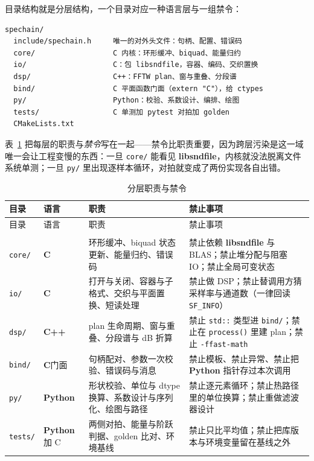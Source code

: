 \documentclass[12pt,a4paper,fontset=fandol]{ctexbook}
\newcommand{\Fn}[1]{\texttt{#1()}}
\newcommand{\Tp}[1]{\texttt{#1}}
\newcommand{\Lib}[1]{\textbf{#1}}
\newcommand{\Lang}[1]{\textsf{\bfseries #1}}
\newcommand{\CL}{\Lang{C}}
\newcommand{\CPP}{\Lang{C++}}
\newcommand{\PY}{\Lang{Python}}
\begin{document}
目录结构就是分层结构，一个目录对应一种语言层与一组禁令：

\begin{lstlisting}[style=shellstyle,caption={工程目录：目录边界即语言与依赖边界},label={lst:ch17-tree}]
spechain/
  include/spechain.h     唯一的对外头文件：句柄、配置、错误码
  core/                  C 内核：环形缓冲、biquad、能量归约
  io/                    C：包 libsndfile，容器、编码、交织置换
  dsp/                   C++：FFTW plan、窗与重叠、分段谱
  bind/                  C 平面函数门面（extern "C"），给 ctypes
  py/                    Python：校验、系数设计、编排、绘图
  tests/                 C 单测加 pytest 对拍加 golden
  CMakeLists.txt
\end{lstlisting}

表~\ref{tab:ch17-layers} 把每层的职责与\emph{禁令}写在一起——禁令比职责重要，因为跨层污染是这一域唯一会让工程变慢的东西：一旦 \Tp{core/} 能看见 \Lib{libsndfile}，内核就没法脱离文件系统单测；一旦 \Tp{py/} 里出现逐样本循环，对拍就变成了两份实现各自出错。

\begin{longtable}{@{}>{\raggedright\arraybackslash}p{}
  >{\raggedright\arraybackslash}p{}
  >{\raggedright\arraybackslash}p{}
  >{\raggedright\arraybackslash}p{}@{}}
\caption{分层职责与禁令}\label{tab:ch17-layers} \\
\toprule
目录 & 语言 & 职责 & 禁止事项 \\
\midrule
\endfirsthead
\toprule
目录 & 语言 & 职责 & 禁止事项 \\
\midrule
\endhead
\midrule
\multicolumn{4}{@{}r}{（接下页）}\\
\endfoot
\bottomrule
\endlastfoot
\Tp{core/} & \CL &
  环形缓冲、biquad 状态更新、能量归约、错误码 &
  禁止依赖 \Lib{libsndfile} 与 BLAS；禁止堆分配与阻塞 IO；禁止全局可变状态 \\
\Tp{io/} & \CL &
  打开与关闭、容器与子格式、交织与平面置换、短读处理 &
  禁止做 DSP；禁止替调用方猜采样率与通道数（一律回读 \Tp{SF\_INFO}） \\
\Tp{dsp/} & \CPP &
  plan 生命周期、窗与重叠、分段谱与 dB 折算 &
  禁止 \Tp{std::} 类型进 \Tp{bind/}；禁止在 \Fn{process} 里建 plan；禁止 \Tp{-ffast-math} \\
\Tp{bind/} & \CL 门面 &
  句柄配对、参数一次校验、错误码与消息 &
  禁止模板、禁止异常、禁止把 \PY{} 指针存过本次调用 \\
\Tp{py/} & \PY &
  形状校验、单位与 dtype 换算、系数设计与序列化、绘图与路径 &
  禁止逐元素循环；禁止热路径里的单位换算；禁止重做滤波器设计 \\
\Tp{tests/} & \PY 加 C &
  两侧对拍、能量与阶跃判据、golden 比对、环境基线 &
  禁止只比平均值；禁止把库版本与环境变量留在基线之外 \\
\end{longtable}
\end{document}

